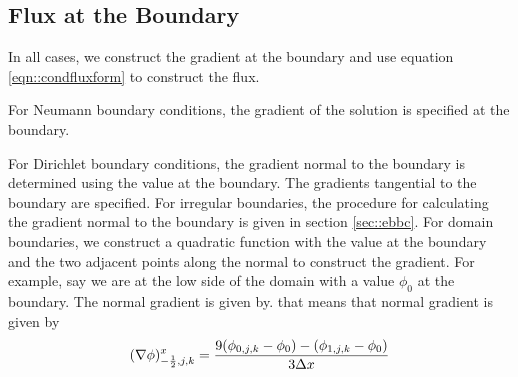 \subsection{Flux at the Boundary}
In all cases, we construct the gradient at the boundary and use 
equation \ref{eqn::condfluxform} to construct the flux.

For Neumann boundary conditions, the gradient of the solution is
specified at the boundary.

For Dirichlet boundary conditions, the gradient normal to the boundary
is determined using the value at the boundary.  The gradients
tangential to the boundary are specified.  For irregular
boundaries, the procedure for calculating the gradient normal to the
boundary is given in section \ref{sec::ebbc}.   For domain boundaries,
we construct a quadratic function with the value at the boundary and
the two adjacent points along the normal to construct the gradient.
For example, say we are at the low side of the domain with a value 
$\phi_0$ at the boundary.  The normal gradient is given by.
that means that normal gradient  is given by
$$
(\nabla \phi)^x_{-\frac{1}{2}, j, k} = \frac{9(\phi_{0,j,k}-\phi_0)  -
  (\phi_{1,j,k}-\phi_0)}{3 \Delta x}
$$
